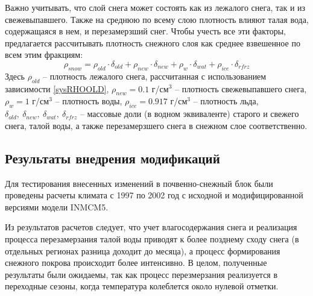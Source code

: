 \documentclass[a4paper, fontsize=14pt]{scrartcl}
\begin{document}
Важно учитывать, что слой снега может состоять как из лежалого снега, так и из свежевыпавшего. Также на среднюю по всему слою плотность влияют талая вода, содержащаяся в нем, и перезамерзший снег. Чтобы учесть все эти факторы, предлагается рассчитывать плотность снежного слоя как среднее взвешенное по всем этим фракциям:
\begin{equation}
    \rho_{snow} = \rho_{old} \cdot \delta_{old} + \rho_{new} \cdot \delta_{new} + \rho_{w} \cdot \delta_{wat} + \rho_{ice} \cdot \delta_{rfrz}
\end{equation}
Здесь $\rho_{old}$ -- плотность лежалого снега, рассчитанная с использованием зависимости \eqref{sysRHOOLD},  $\rho_{new} = 0.1$ г/см$^3$ -- плотность свежевыпавшего снега, $\rho_{w} = 1$ г/см$^3$ -- плотность воды, $\rho_{ice} = 0.917$ г/см$^3$ -- плотность льда, $\delta_{old}, ~\delta_{new}, ~\delta_{wat}, ~\delta_{rfrz}$ -- массовые доли (в водном эквиваленте) старого и свежего снега, талой воды, а также перезамерзшего снега в снежном слое соответственно.


\subsection{Результаты внедрения модификаций}

Для тестирования внесенных изменений в почвенно-снежный блок были проведены расчеты климата с 1997 по 2002 год с исходной и модифицированной версиями модели INMCM5. 

Из результатов расчетов следует, что учет влагосодержания снега и реализация процесса перезамерзания талой воды приводят к более позднему сходу снега (в отдельных регионах разница доходит до месяца), а процесс формирования снежного покрова происходит более интенсивно. В целом, полученные результаты были ожидаемы, так как процесс перезмерзания реализуется в переходные сезоны, когда температура колеблется около нулевой отметки.
\end{document}
